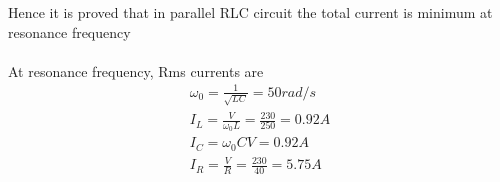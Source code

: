 \documentclass[journal,12pt,twocolumn]{IEEEtran}
\theoremstyle{remark}
\begin{document}
Hence it is proved that in parallel RLC circuit the total current is minimum at resonance frequency\\

   \\
  At resonance frequency, Rms currents are\\
\begin{align}
\omega_0=\frac{1}{\sqrt{LC}}= 50rad/s\\
I_L=\frac{V}{\omega_0L}=\frac{230}{250}=0.92A\\
   I_C=\omega_0CV= 0.92 A\\
   I_R=\frac{V}{R}=\frac{230}{40}=5.75A
 \end{align}
\end{document}
